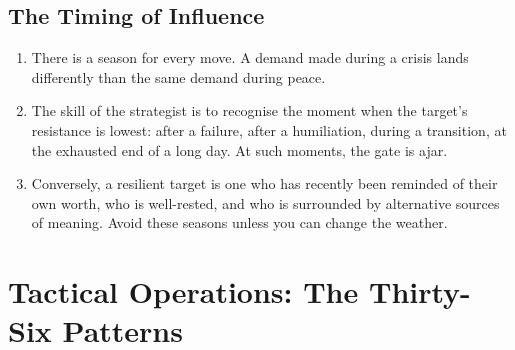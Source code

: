 \documentclass[12pt,a4paper,oneside]{book}
\begin{document}
\section{The Timing of Influence}
\begin{enumerate}[leftmargin=*, label=\arabic*.]
\item There is a season for every move. A demand made during a crisis lands differently than the same demand during peace.
\item The skill of the strategist is to recognise the moment when the target's resistance is lowest: after a failure, after a humiliation, during a transition, at the exhausted end of a long day. At such moments, the gate is ajar.
\item Conversely, a resilient target is one who has recently been reminded of their own worth, who is well-rested, and who is surrounded by alternative sources of meaning. Avoid these seasons unless you can change the weather.
\end{enumerate}

\chapter{Tactical Operations: The Thirty-Six Patterns}
\end{document}
